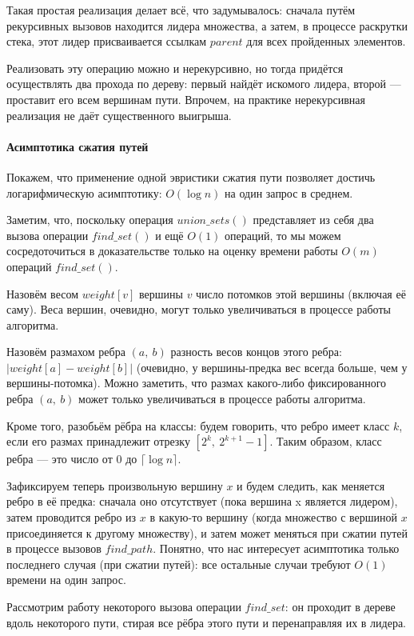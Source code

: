 \documentclass[a4paper,12pt]{article}
\begin{document}
Такая простая реализация делает всё, что задумывалось: сначала путём рекурсивных вызовов находится лидера множества, а затем, в процессе раскрутки стека, этот лидер присваивается ссылкам $parent$ для всех пройденных элементов.

Реализовать эту операцию можно и нерекурсивно, но тогда придётся осуществлять два прохода по дереву: первый найдёт искомого лидера, второй — проставит его всем вершинам пути. Впрочем, на практике нерекурсивная реализация не даёт существенного выигрыша.

\paragraph{Асимптотика сжатия путей}

Покажем, что применение одной эвристики сжатия пути позволяет достичь логарифмическую асимптотику: $O(\log n)$ на один запрос в среднем.

Заметим, что, поскольку операция $union\_sets()$ представляет из себя два вызова операции $find\_set()$ и ещё $O(1)$ операций, то мы можем сосредоточиться в доказательстве только на оценку времени работы $O(m)$ операций $find\_set()$.

Назовём весом $weight[v]$ вершины $v$ число потомков этой вершины (включая её саму). Веса вершин, очевидно, могут только увеличиваться в процессе работы алгоритма.

Назовём размахом ребра $(a,\ b)$ разность весов концов этого ребра: $|weight[a] - weight[b]|$ (очевидно, у вершины-предка вес всегда больше, чем у вершины-потомка). Можно заметить, что размах какого-либо фиксированного ребра $(a,\ b)$ может только увеличиваться в процессе работы алгоритма.

Кроме того, разобьём рёбра на классы: будем говорить, что ребро имеет класс $k$, если его размах принадлежит отрезку $[2^k,\  2^{k+1}-1]$. Таким образом, класс ребра — это число от 0 до $\lceil \log n \rceil$.

Зафиксируем теперь произвольную вершину $x$ и будем следить, как меняется ребро в её предка: сначала оно отсутствует (пока вершина x является лидером), затем проводится ребро из $x$ в какую-то вершину (когда множество с вершиной $x$ присоединяется к другому множеству), и затем может меняться при сжатии путей в процессе вызовов $find\_path$. Понятно, что нас интересует асимптотика только последнего случая (при сжатии путей): все остальные случаи требуют $O(1)$ времени на один запрос.

Рассмотрим работу некоторого вызова операции $find\_set$: он проходит в дереве вдоль некоторого пути, стирая все рёбра этого пути и перенаправляя их в лидера.
\end{document}
